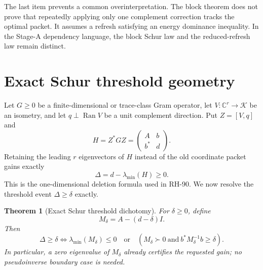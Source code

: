 \documentclass[11pt]{article}
\newtheorem{theorem}{Theorem}[section]
\theoremstyle{definition}
\theoremstyle{remark}
\newcommand{\Ran}{\operatorname{Ran}}
\begin{document}
The last item prevents a common overinterpretation.  The block theorem does
not prove that repeatedly applying only one complement correction tracks the
optimal packet.  It assumes a refresh satisfying an energy dominance
inequality.  In the Stage-A dependency language, the block Schur law and the
reduced-refresh law remain distinct.

\section{Exact Schur threshold geometry}

Let $G\ge0$ be a finite-dimensional or trace-class Gram operator, let
$V:\mathbb C^r\to\mathcal K$ be an isometry, and let
$q\perp\Ran V$ be a unit complement direction.  Put $Z=[V,q]$ and
\[
 H=Z^*GZ=\begin{pmatrix}A&b\\b^*&d\end{pmatrix}.
\]
Retaining the leading $r$ eigenvectors of $H$ instead of the old coordinate
packet gains exactly
\begin{equation}
 \Delta=d-\lambda_{\min}(H)\ge0.
 \label{eq:gain}
\end{equation}
This is the one-dimensional deletion formula used in RH-90.  We now resolve
the threshold event $\Delta\ge\delta$ exactly.

\begin{theorem}[Exact Schur threshold dichotomy]
\label{thm:dichotomy}
For $\delta\ge0$, define
\[
 M_\delta=A-(d-\delta)I.
\]
Then
\begin{equation}
 \boxed{
 \Delta\ge\delta
 \iff
 \lambda_{\min}(M_\delta)\le0
 \quad\text{or}\quad
 \left(M_\delta\succ0\ \text{and}\
 b^*M_\delta^{-1}b\ge\delta\right).}
 \label{eq:dichotomy}
\end{equation}
In particular, a zero eigenvalue of $M_\delta$ already certifies the requested
gain; no pseudoinverse boundary case is needed.
\end{theorem}
\end{document}
